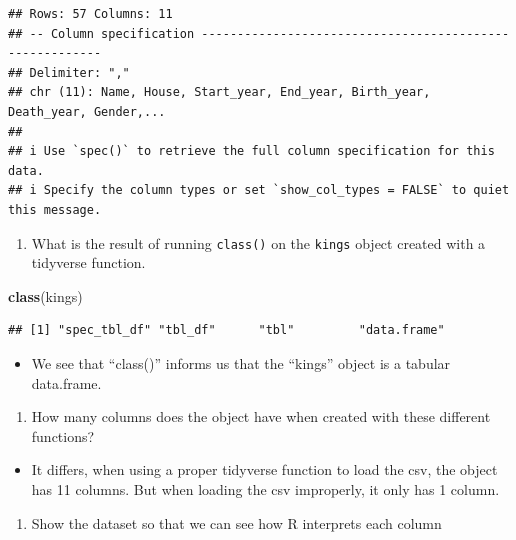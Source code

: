 \documentclass[
]{article}
\newenvironment{Shaded}{\begin{snugshade}}{\end{snugshade}}
\newcommand{\FunctionTok}[1]{\textcolor[rgb]{0.13,0.29,0.53}{\textbf{#1}}}
\newcommand{\NormalTok}[1]{#1}
\providecommand{\tightlist}{%
  \setlength{\itemsep}{0pt}\setlength{\parskip}{0pt}}
\begin{document}
\begin{verbatim}
## Rows: 57 Columns: 11
## -- Column specification --------------------------------------------------------
## Delimiter: ","
## chr (11): Name, House, Start_year, End_year, Birth_year, Death_year, Gender,...
## 
## i Use `spec()` to retrieve the full column specification for this data.
## i Specify the column types or set `show_col_types = FALSE` to quiet this message.
\end{verbatim}

\begin{enumerate}
\def\labelenumi{\arabic{enumi}.}
\setcounter{enumi}{1}
\tightlist
\item
  What is the result of running \texttt{class()} on the \texttt{kings}
  object created with a tidyverse function.
\end{enumerate}

\begin{Shaded}
\begin{Highlighting}[]
\FunctionTok{class}\NormalTok{(kings)}
\end{Highlighting}
\end{Shaded}

\begin{verbatim}
## [1] "spec_tbl_df" "tbl_df"      "tbl"         "data.frame"
\end{verbatim}

\begin{itemize}
\tightlist
\item
  We see that ``class()'' informs us that the ``kings'' object is a
  tabular data.frame.
\end{itemize}

\begin{enumerate}
\def\labelenumi{\arabic{enumi}.}
\setcounter{enumi}{2}
\tightlist
\item
  How many columns does the object have when created with these
  different functions?
\end{enumerate}

\begin{itemize}
\tightlist
\item
  It differs, when using a proper tidyverse function to load the csv,
  the object has 11 columns. But when loading the csv improperly, it
  only has 1 column.
\end{itemize}

\begin{enumerate}
\def\labelenumi{\arabic{enumi}.}
\setcounter{enumi}{3}
\tightlist
\item
  Show the dataset so that we can see how R interprets each column
\end{enumerate}
\end{document}
